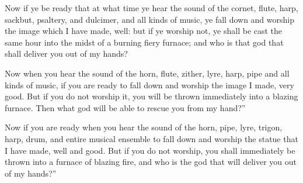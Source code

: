 			\begin{versebox}
					\item[BHS] 
					\item[LXX] 
					\item[ASV] Now if ye be ready that at what time ye hear the sound of the cornet, flute, harp, sackbut, psaltery, and dulcimer, and all kinds of music, ye fall down and worship the image which I have made, well: but if ye worship not, ye shall be cast the same hour into the midst of a burning fiery furnace; and who is that god that shall deliver you out of my hands?
					\item[NIV] Now when you hear the sound of the horn, flute, zither, lyre, harp, pipe and all kinds of music, if you are ready to fall down and worship the image I made, very good. But if you do not worship it, you will be thrown immediately into a blazing furnace. Then what god will be able to rescue you from my hand?”
					\item[NRSV] Now if you are ready when you hear the sound of the horn, pipe, lyre, trigon, harp, drum, and entire musical ensemble to fall down and worship the statue that I have made, well and good. But if you do not worship, you shall immediately be thrown into a furnace of blazing fire, and who is the god that will deliver you out of my hands?”
			\end{versebox}

